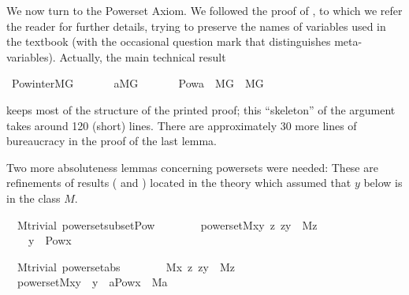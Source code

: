 We now turn to the Powerset Axiom. We followed the proof of
\cite[IV.2.27]{kunen2011set}, to which we refer the reader for further
details, trying to  preserve the
names of variables used in the textbook (with the occasional question
mark that distinguishes meta-variables). Actually, the main technical result
\begin{isabelle}
\isamarkupfalse%
\ Pow{\isacharunderscore}inter{\isacharunderscore}MG{\isacharcolon}\isanewline
\ \ \isanewline
\ \ \ \ {\isachardoublequoteopen}a{\isasymin}M{\isacharbrackleft}G{\isacharbrackright}{\isachardoublequoteclose}\isanewline
\ \ \isanewline
\ \ \ \ {\isachardoublequoteopen}Pow{\isacharparenleft}a{\isacharparenright}\ {\isasyminter}\ M{\isacharbrackleft}G{\isacharbrackright}\ {\isasymin}\ M{\isacharbrackleft}G{\isacharbrackright}{\isachardoublequoteclose}
\end{isabelle}
keeps most of the structure of the printed proof; this ``skeleton'' of the
argument takes around 120 (short) lines. There are approximately 30
more lines of bureaucracy in the proof of the last lemma. 

Two more
absoluteness lemmas concerning powersets were needed: These are
refinements of results ( and
) located in the theory  which assumed that
$y$ below is in the class $M$.
\begin{isabelle}
\isamarkupfalse%
\ {\isacharparenleft}\ M{\isacharunderscore}trivial{\isacharparenright}\ powerset{\isacharunderscore}subset{\isacharunderscore}Pow{\isacharcolon}\isanewline
\ \ \ \isanewline
\ \ \ \ {\isachardoublequoteopen}powerset{\isacharparenleft}M{\isacharcomma}x{\isacharcomma}y{\isacharparenright}{\isachardoublequoteclose}\ {\isachardoublequoteopen}{\isasymAnd}z{\isachardot}\ z{\isasymin}y\ {\isasymLongrightarrow}\ M{\isacharparenleft}z{\isacharparenright}{\isachardoublequoteclose}\isanewline
\ \ \ \isanewline
\ \ \ \ {\isachardoublequoteopen}y\ {\isasymsubseteq}\ Pow{\isacharparenleft}x{\isacharparenright}{\isachardoublequoteclose}
\end{isabelle}
\begin{isabelle}
\isamarkupfalse%
\ {\isacharparenleft}\ M{\isacharunderscore}trivial{\isacharparenright}\ powerset{\isacharunderscore}abs{\isacharcolon}\ \isanewline
\ \ \isanewline
\ \ \ \ {\isachardoublequoteopen}M{\isacharparenleft}x{\isacharparenright}{\isachardoublequoteclose}\ {\isachardoublequoteopen}{\isasymAnd}z{\isachardot}\ z{\isasymin}y\ {\isasymLongrightarrow}\ M{\isacharparenleft}z{\isacharparenright}{\isachardoublequoteclose}\isanewline
\ \ \isanewline
\ \ {\isachardoublequoteopen}powerset{\isacharparenleft}M{\isacharcomma}x{\isacharcomma}y{\isacharparenright}\ {\isasymlongleftrightarrow}\ y\ {\isacharequal}\ {\isacharbraceleft}a{\isasymin}Pow{\isacharparenleft}x{\isacharparenright}\ {\isachardot}\ M{\isacharparenleft}a{\isacharparenright}{\isacharbraceright}{\isachardoublequoteclose}
\end{isabelle}

